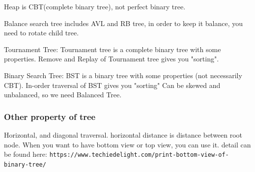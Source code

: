 \documentclass[a4paper,11pt,twoside]{book}
\begin{document}
	\par Heap is CBT(complete binary tree), not perfect binary tree. 

	\par Balance search tree includes AVL and RB tree, in order to keep it balance, you need to rotate child tree. 

	\par Tournament Tree: Tournament tree is a complete binary tree with some properties. Remove and  Replay of Tournament tree gives you "sorting". 

	\par Binary Search Tree: BST is a binary tree with some properties (not necessarily CBT). In-order traversal of BST gives you "sorting" Can be skewed and unbalanced, so we need Balanced Tree.


\subsubsection{Other property of tree}

	\par Horizontal, and diagonal traversal. horizontal distance is distance between root node. When you want to have bottom view or top view, you can use it.  detail can be found here: \newline
	\verb|https://www.techiedelight.com/print-bottom-view-of-binary-tree/|
	
\end{document}
